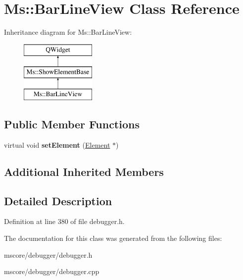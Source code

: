 \hypertarget{class_ms_1_1_bar_line_view}{}\section{Ms\+:\+:Bar\+Line\+View Class Reference}
\label{class_ms_1_1_bar_line_view}
Inheritance diagram for Ms\+:\+:Bar\+Line\+View\+:\begin{figure}[H]
\begin{center}
\leavevmode
\includegraphics[height=3.000000cm]{class_ms_1_1_bar_line_view}
\end{center}
\end{figure}
\subsection*{Public Member Functions}
\begin{DoxyCompactItemize}
\item 
\mbox{\label{class_ms_1_1_bar_line_view_a910d5a7214c620b63dc7f7cf0715b566}} 
virtual void {\bfseries set\+Element} (\hyperlink{class_ms_1_1_element}{Element} $\ast$)
\end{DoxyCompactItemize}
\subsection*{Additional Inherited Members}


\subsection{Detailed Description}


Definition at line 380 of file debugger.\+h.



The documentation for this class was generated from the following files\+:\begin{DoxyCompactItemize}
\item 
mscore/debugger/debugger.\+h\item 
mscore/debugger/debugger.\+cpp\end{DoxyCompactItemize}
